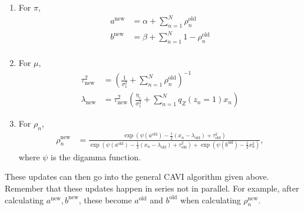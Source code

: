 \begin{enumerate}
    \item For $\pi$,
    \begin{align*}
        a^\text{new} &=\alpha + \sum_{n=1}^N \rho_n^{\text{old}}\\
        b^\text{new} &=\beta + \sum_{n=1}^N 1-\rho_n^{\text{old}}\\
    \end{align*}
    \item For $\mu$,
    \begin{align*}
        \tau^2_{\text{new}} &=\left(\frac{1}{\sigma_1^2}+\sum_{n=1}^N \rho_n^{\text{old}}\right)^{-1}\\
    \lambda_{\text{new}} &= \tau^2_{\text{new}}\left(\frac{\eta_1}{\sigma_1^2}+\sum_{n=1}^N q_Z(z_n=1)x_n\right)
    \end{align*}
    \item For $\rho_n$,
    \begin{align*}
        \rho_n^{\text{new}} &=\frac{\exp\left(\psi(a^{\text{old}})-\frac{1}{2}(x_n-\lambda_{\text{old}})+\tau^2_{\text{old}}\right)}{\exp\left(\psi(a^{\text{old}})-\frac{1}{2}(x_n-\lambda_{\text{old}})+\tau^2_{\text{old}}\right) + \exp\left(\psi(b^\text{old})-\frac{1}{2}x_n^2\right)},
    \end{align*}
    where $\psi$ is the digamma function.
\end{enumerate}
These updates can then go into the general CAVI algorithm given above. Remember that these updates happen in series not in parallel. For example, after calculating $a^{\text{new}},b^{\text{new}}$, these become $a^{\text{old}}$ and $b^{\text{old}}$ when calculating $\rho_n^{\text{new}}$. 

